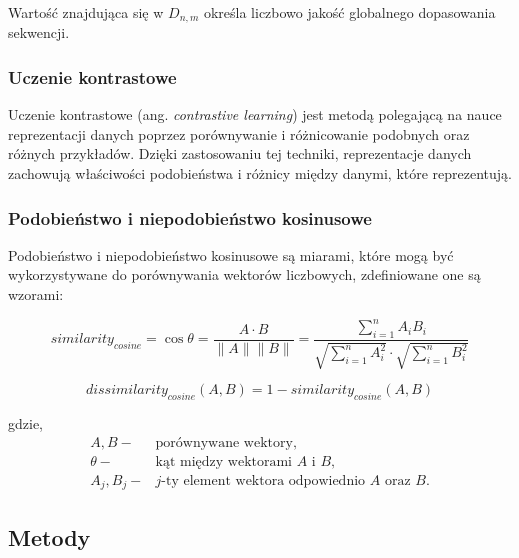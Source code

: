             Wartość znajdująca się w $D_{n, m}$ określa liczbowo jakość globalnego dopasowania sekwencji.

        \subsubsection{Uczenie kontrastowe}

            Uczenie kontrastowe (ang. \textit{contrastive learning}) \cite{Bromley1993} jest metodą polegającą na nauce reprezentacji danych poprzez porównywanie i różnicowanie podobnych oraz różnych przykładów. Dzięki zastosowaniu tej techniki, reprezentacje danych zachowują właściwości podobieństwa i różnicy między danymi, które reprezentują.

        \subsubsection{Podobieństwo i niepodobieństwo kosinusowe}

            Podobieństwo i niepodobieństwo kosinusowe są miarami, które mogą być wykorzystywane do porównywania wektorów liczbowych, zdefiniowane one są wzorami:

            \begin{equation}
                similarity_{cosine} = \cos{\theta} = \frac{A \cdot B}{\|A\| \|B\|} = \frac{
                        \sum^{n}_{i = 1}A_i B_i
                    }{
                        \sqrt{
                            \sum^{n}_{i = 1}A_i^2
                        }
                        \cdot
                        \sqrt{
                            \sum^{n}_{i = 1}B_i^2
                        }
                    }
            \end{equation}

            \begin{equation}
                dissimilarity_{cosine}(A, B) = 1 - similarity_{cosine}(A, B)
            \end{equation}

            gdzie,
            \begin{align*} 
                A, B -& \text{porównywane wektory}, \\
                \theta -& \text{kąt między wektorami $A$ i $B$}, \\
                A_j, B_j -& \text{$j$-ty element wektora odpowiednio $A$ oraz $B$}.
            \end{align*}


    \subsection{Metody}
    
